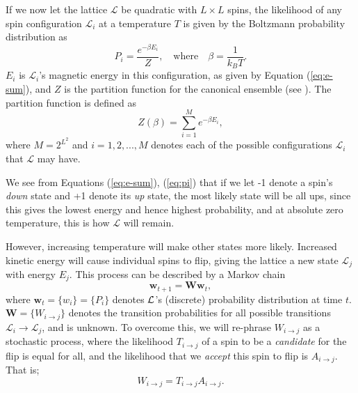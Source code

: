 \documentclass[]{article}
\begin{document}
If we now let the lattice $\mathcal{L}$ be quadratic with $L \times L$ spins, the likelihood of any spin configuration $\mathcal{L}_i$ at a temperature $T$ is given by the Boltzmann probability distribution as
\begin{equation} \label{eq:pi}
	P_i = \frac{e^{-\beta E_i}}{Z}, \quad \text{where} \quad \beta = \frac{1}{k_BT}.
\end{equation}
$E_i$ is $\mathcal{L}_i$'s magnetic energy in this configuration, as given by Equation (\ref{eq:e-sum}), and $Z$ is the partition function for the canonical ensemble (see \cite{fys4150-notes}). The partition function is defined as
\begin{equation}
	Z(\beta) = \sum_{i=1}^{M} e^{-\beta E_i},
\end{equation}
where $M = 2^{L^2}$ and $i = 1,2,...,M$ denotes each of the possible configurations $\mathcal{L}_i$ that $\mathcal{L}$ may have.

We see from Equations (\ref{eq:e-sum}), (\ref{eq:pi}) that if we let -1 denote a spin's \textit{down} state and +1 denote its \textit{up} state, the most likely state will be all ups, since this gives the lowest energy and hence highest probability, and at absolute zero temperature, this is how $\mathcal{L}$ will remain. 

However, increasing temperature will make other states more likely. Increased kinetic energy will cause individual spins to flip, giving the lattice a new state $\mathcal{L}_j$ with energy $E_j$. This process can be described by a Markov chain
\begin{equation} \label{eq:markov-chain}
	\mathbf{w}_{t+1} = \mathbf{W} \mathbf{w}_{t},
\end{equation}
where $\mathbf{w}_t = \{w_i\} = \{P_i\}$ denotes $\cal{L}$'s (discrete) probability distribution at time $t$. $\mathbf{W} = \{W_{i \rightarrow j}\}$ denotes the transition probabilities for all possible transitions $\mathcal{L}_i \rightarrow \mathcal{L}_j$, and is unknown. To overcome this, we will re-phrase $W_{i \rightarrow j}$ as a stochastic process, where the likelihood $T_{i \rightarrow j}$ of a spin to be a \textit{candidate} for the flip is equal for all, and the likelihood that we \textit{accept} this spin to flip is $A_{i \rightarrow j}$. That is;
\begin{equation}
	W_{i \rightarrow j} = T_{i \rightarrow j} A_{i \rightarrow j}.
\end{equation}
\end{document}
